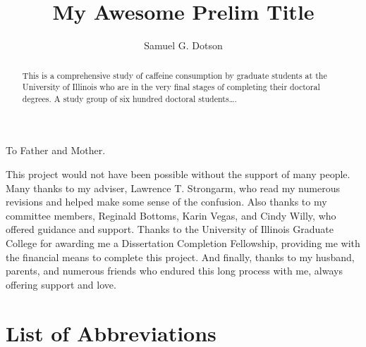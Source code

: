 \documentclass{uiucthesis2021}
\begin{document}
\title{My Awesome Prelim Title}
\author{Samuel G. Dotson}
\phdthesis
{}
\maketitle

\frontmatter

\begin{abstract}
This is a comprehensive study of caffeine consumption by graduate
students at the University of Illinois who are in the very final
stages of completing their doctoral degrees. A study group of six
hundred doctoral students\ldots.
\end{abstract}

\begin{dedication}
To Father and Mother.
\end{dedication}

\begin{acknowledgments}
This project would not have been possible without the support of
many people. Many thanks to my adviser, Lawrence T. Strongarm, who
read my numerous revisions and helped make some sense of the
confusion. Also thanks to my committee members, Reginald Bottoms,
Karin Vegas, and Cindy Willy, who offered guidance and support.
Thanks to the University of Illinois Graduate College for awarding
me a Dissertation Completion Fellowship, providing me with the
financial means to complete this project. And finally, thanks to
my husband, parents, and numerous friends who endured this long
process with me, always offering support and love.
\end{acknowledgments}

{
    \hypersetup{linkcolor=black}  %
    \tableofcontents
}


\chapter{List of Abbreviations}
\end{document}
